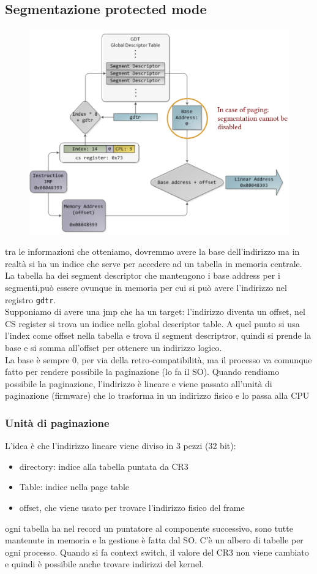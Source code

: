 \documentclass[12pt, oneside]{extbook} %
\begin{document}
\subsection{Segmentazione protected mode}
\begin{figure}[!h]
	\includegraphics[scale=0.3]{immagini/seg_prot_mode.png}
\end{figure}
tra le informazioni che otteniamo, dovremmo avere la base dell'indirizzo ma in realtà si ha un indice che serve per accedere ad un tabella in memoria centrale. La tabella ha dei segment descriptor che mantengono i base address per i segmenti,può essere ovunque in memoria per cui si può avere l'indirizzo nel registro \texttt{gdtr}.\\Supponiamo di avere una jmp che ha un target: l'indirizzo diventa un offset, nel CS register si trova un indice nella global descriptor table. A quel punto si usa l'index come offset nella tabella e trova il segment descriptror, quindi si prende la base e si somma all'offset per ottenere un indirizzo logico.\\ La base è sempre 0, per via della retro-compatibilità, ma il processo va comunque fatto per rendere possibile la paginazione (lo fa il SO). Quando rendiamo possibile la paginazione, l'indirizzo è lineare e viene passato all'unità di paginazione (firmware) che lo trasforma in un indirizzo fisico e lo passa alla CPU
\subsubsection{Unità di paginazione}
L'idea è che l'indirizzo lineare viene diviso in 3 pezzi (32 bit):
\begin{itemize}
\item directory: indice alla tabella puntata da CR3
\item Table: indice nella page table
\item offset, che viene usato per trovare l'indirizzo fisico del frame
\end{itemize}
ogni tabella ha nel record un puntatore al componente successivo, sono tutte mantenute in memoria e la gestione è fatta dal SO. C'è un albero di tabelle per ogni processo. Quando si fa context switch, il valore del CR3 non viene cambiato e quindi è possibile anche trovare indirizzi del kernel.
\end{document}
